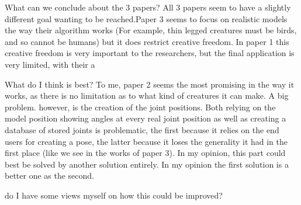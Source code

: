 \documentclass{article}
\begin{document}
What can we conclude about the 3 papers?
All 3 papers seem to have a slightly different goal wanting to be reached.Paper 3 seems to focus on realistic models the way their algorithm works (For example, thin legged creatures must be birds, and so cannot be humans) but it does restrict creative freedom. In paper 1 this creative freedom is very important to the researchers, but the final application is very limited, with their a

What do I think is best?
To me, paper 2 seems the most promising in the way it works, as there is no limitation as to what 
kind of creatures it can make. A big problem. however, is the creation of the joint positions. Both relying on the model position showing angles at every real joint position as well as creating a database of stored joints is problematic, the first because it relies on the end users for creating a pose, the latter because it loses the generality it had in the first place (like we see in the works of paper 3). In my opinion, this part could best be solved by another solution entirely. In my opinion the first solution is a better one as the second.

do I have some views myself on how this could be improved?



\end{document}
